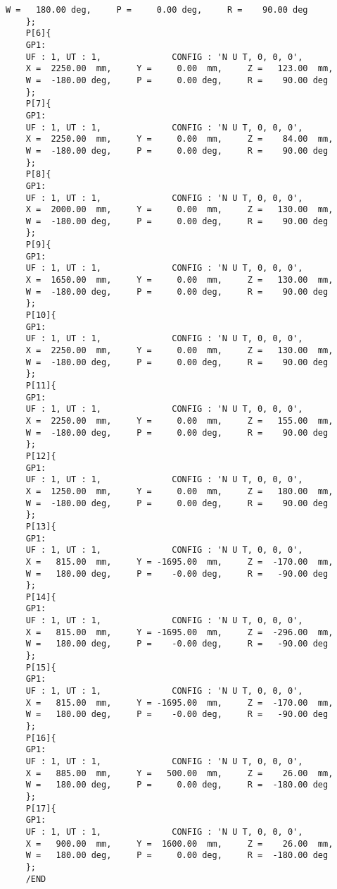 \begin{lstlisting}[language=inform]
	W =   180.00 deg,     P =     0.00 deg,     R =    90.00 deg
	};
	P[6]{ 
	GP1:
	UF : 1, UT : 1,              CONFIG : 'N U T, 0, 0, 0',
	X =  2250.00  mm,     Y =     0.00  mm,     Z =   123.00  mm,
	W =  -180.00 deg,     P =     0.00 deg,     R =    90.00 deg
	};
	P[7]{ 
	GP1:
	UF : 1, UT : 1,              CONFIG : 'N U T, 0, 0, 0',
	X =  2250.00  mm,     Y =     0.00  mm,     Z =    84.00  mm,
	W =  -180.00 deg,     P =     0.00 deg,     R =    90.00 deg
	};
	P[8]{ 
	GP1:
	UF : 1, UT : 1,              CONFIG : 'N U T, 0, 0, 0',
	X =  2000.00  mm,     Y =     0.00  mm,     Z =   130.00  mm,
	W =  -180.00 deg,     P =     0.00 deg,     R =    90.00 deg
	};
	P[9]{ 
	GP1:
	UF : 1, UT : 1,              CONFIG : 'N U T, 0, 0, 0',
	X =  1650.00  mm,     Y =     0.00  mm,     Z =   130.00  mm,
	W =  -180.00 deg,     P =     0.00 deg,     R =    90.00 deg
	};
	P[10]{ 
	GP1:
	UF : 1, UT : 1,              CONFIG : 'N U T, 0, 0, 0',
	X =  2250.00  mm,     Y =     0.00  mm,     Z =   130.00  mm,
	W =  -180.00 deg,     P =     0.00 deg,     R =    90.00 deg
	};
	P[11]{ 
	GP1:
	UF : 1, UT : 1,              CONFIG : 'N U T, 0, 0, 0',
	X =  2250.00  mm,     Y =     0.00  mm,     Z =   155.00  mm,
	W =  -180.00 deg,     P =     0.00 deg,     R =    90.00 deg
	};
	P[12]{ 
	GP1:
	UF : 1, UT : 1,              CONFIG : 'N U T, 0, 0, 0',
	X =  1250.00  mm,     Y =     0.00  mm,     Z =   180.00  mm,
	W =  -180.00 deg,     P =     0.00 deg,     R =    90.00 deg
	};
	P[13]{ 
	GP1:
	UF : 1, UT : 1,              CONFIG : 'N U T, 0, 0, 0',
	X =   815.00  mm,     Y = -1695.00  mm,     Z =  -170.00  mm,
	W =   180.00 deg,     P =    -0.00 deg,     R =   -90.00 deg
	};
	P[14]{ 
	GP1:
	UF : 1, UT : 1,              CONFIG : 'N U T, 0, 0, 0',
	X =   815.00  mm,     Y = -1695.00  mm,     Z =  -296.00  mm,
	W =   180.00 deg,     P =    -0.00 deg,     R =   -90.00 deg
	};
	P[15]{ 
	GP1:
	UF : 1, UT : 1,              CONFIG : 'N U T, 0, 0, 0',
	X =   815.00  mm,     Y = -1695.00  mm,     Z =  -170.00  mm,
	W =   180.00 deg,     P =    -0.00 deg,     R =   -90.00 deg
	};
	P[16]{ 
	GP1:
	UF : 1, UT : 1,              CONFIG : 'N U T, 0, 0, 0',
	X =   885.00  mm,     Y =   500.00  mm,     Z =    26.00  mm,
	W =   180.00 deg,     P =     0.00 deg,     R =  -180.00 deg
	};
	P[17]{ 
	GP1:
	UF : 1, UT : 1,              CONFIG : 'N U T, 0, 0, 0',
	X =   900.00  mm,     Y =  1600.00  mm,     Z =    26.00  mm,
	W =   180.00 deg,     P =     0.00 deg,     R =  -180.00 deg
	};
	/END
	
\end{lstlisting}